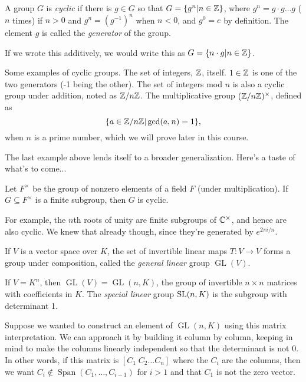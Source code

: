 \documentclass[11 pt]{scrartcl}
\DeclareMathOperator{\GL}{GL}
\DeclareMathOperator{\Span}{Span}
\begin{document}
A group $G$ is \emph{cyclic} if there is $g\in G$ so that $G = \{g^n | n\in \mathbb Z\}$, where $g^n = g\cdot g\dots g$ ($n$ times) if $n>0$ and $g^n = (g^{-1})^n$ when $n < 0$, and $g^0 = e$ by definition. The element $g$ is called the \emph{generator} of the group. 

If we wrote this additively, we would write this as $G = \{n\cdot g | n\in \mathbb Z\}$. 

\begin{example}
    Some examples of cyclic groups.
\itemnum
    \ii The set of integers, $\mathbb Z$, itself. $1\in \mathbb Z$ is one of the two generators (-1 being the other). 
    \ii The set of integers mod $n$ is also a cyclic group under addition, noted as $\mathbb Z/n\mathbb Z$.
    \ii The multiplicative group $(\mathbb Z/n\mathbb Z)^\times$, defined as 
    \[ \{a\in \mathbb Z/n\mathbb Z | \gcd(a,n) = 1\},\] 
    when $n$ is a prime number, which we will prove later in this course. 
\itemend
\end{example}

The last example above lends itself to a broader generalization. Here's a taste of what's to come... 
\begin{theorem}
    Let $F^\times$ be the group of nonzero elements of a field $F$ (under multiplication). If $G\subseteq F^\times$ is a finite subgroup, then $G$ is cyclic. 
\end{theorem}
For example, the $n$th roots of unity are finite subgroups of $\mathbb C^\times$, and hence are also cyclic. We knew that already though, since they're generated by $e^{2\pi i/n}$. 

\begin{example}
    If $V$ is a vector space over $K$, the set of invertible linear maps $T: V\to V$ forms a group under composition, called the \emph{general linear} group $\GL(V)$. 

    If $V = K^n$, then $\GL(V) = \GL(n, K)$, the group of invertible $n\times n$ matrices with coefficients in $K$. The \emph{special linear} group $\text{SL}(n, K)$ is the subgroup with determinant 1. 
\end{example}

Suppose we wanted to construct an element of $\GL(n, K)$ using this matrix interpretation. We can approach it by building it column by column, keeping in mind to make the columns linearly independent so that the determinant is not 0. In other words, if this matrix is $[C_1\;C_2\dots C_n]$ where the $C_i$ are the columns, then we want $C_i \not\in \Span(C_1, \dots, C_{{i-1}})$ for $i > 1$ and that $C_1$ is not the zero vector. 
\end{document}

